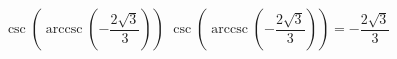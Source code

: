  {$\csc\left(\operatorname{arccsc}\left(-\dfrac{2\sqrt{3}}{3}\right)\right)$}
{ $\csc\left(\operatorname{arccsc}\left(-\dfrac{2\sqrt{3}}{3}\right)\right) = -\dfrac{2\sqrt{3}}{3}$}
